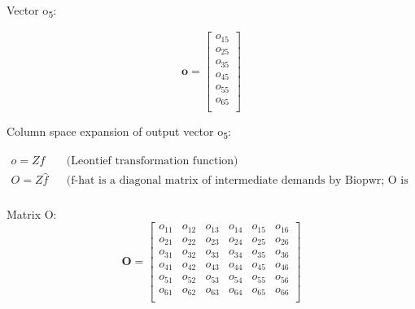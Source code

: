 \documentclass[
  letterpaper,
  DIV=11,
  numbers=noendperiod]{scrartcl}
\begin{document}
Vector o\textsubscript{5}:

\[\mathbf{o} = \left[\begin{array}
{rrr}
o_{15} \\
o_{25} \\
o_{35} \\
o_{45} \\
o_{55} \\
o_{65} \\
\end{array}\right]
\]

Column space expansion of output vector o\textsubscript{5}:

\[
\begin{align}
    o = Zf && \text{(Leontief transformation function)}\\
    O = Z\hat{f} && \text{(f-hat is a diagonal matrix of intermediate demands by Biopwr; O is the column space of o)}\\
\end{align}
\]

Matrix O: \[\mathbf{O} = \left[\begin{array}
{rrr}
o_{11} & o_{12} & o_{13} & o_{14} & o_{15} & o_{16} \\
o_{21} & o_{22} & o_{23} & o_{24} & o_{25} & o_{26} \\
o_{31} & o_{32} & o_{33} & o_{34} & o_{35} & o_{36} \\
o_{41} & o_{42} & o_{43} & o_{44} & o_{45} & o_{46} \\
o_{51} & o_{52} & o_{53} & o_{54} & o_{55} & o_{56} \\
o_{61} & o_{62} & o_{63} & o_{64} & o_{65} & o_{66} \\
\end{array}\right]
\]
\end{document}
